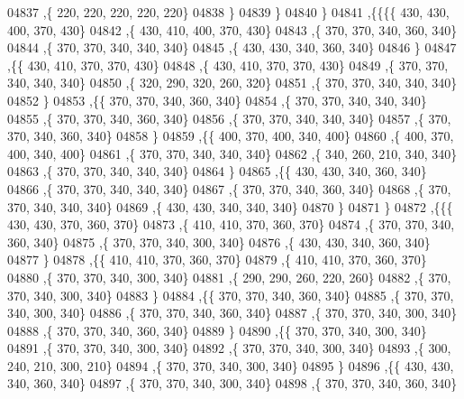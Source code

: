 \begin{DoxyCode}
04837     ,\{   220,   220,   220,   220,   220\}
04838     \}
04839    \}
04840   \}
04841  ,\{\{\{\{   430,   430,   400,   370,   430\}
04842     ,\{   430,   410,   400,   370,   430\}
04843     ,\{   370,   370,   340,   360,   340\}
04844     ,\{   370,   370,   340,   340,   340\}
04845     ,\{   430,   430,   340,   360,   340\}
04846     \}
04847    ,\{\{   430,   410,   370,   370,   430\}
04848     ,\{   430,   410,   370,   370,   430\}
04849     ,\{   370,   370,   340,   340,   340\}
04850     ,\{   320,   290,   320,   260,   320\}
04851     ,\{   370,   370,   340,   340,   340\}
04852     \}
04853    ,\{\{   370,   370,   340,   360,   340\}
04854     ,\{   370,   370,   340,   340,   340\}
04855     ,\{   370,   370,   340,   360,   340\}
04856     ,\{   370,   370,   340,   340,   340\}
04857     ,\{   370,   370,   340,   360,   340\}
04858     \}
04859    ,\{\{   400,   370,   400,   340,   400\}
04860     ,\{   400,   370,   400,   340,   400\}
04861     ,\{   370,   370,   340,   340,   340\}
04862     ,\{   340,   260,   210,   340,   340\}
04863     ,\{   370,   370,   340,   340,   340\}
04864     \}
04865    ,\{\{   430,   430,   340,   360,   340\}
04866     ,\{   370,   370,   340,   340,   340\}
04867     ,\{   370,   370,   340,   360,   340\}
04868     ,\{   370,   370,   340,   340,   340\}
04869     ,\{   430,   430,   340,   340,   340\}
04870     \}
04871    \}
04872   ,\{\{\{   430,   430,   370,   360,   370\}
04873     ,\{   410,   410,   370,   360,   370\}
04874     ,\{   370,   370,   340,   360,   340\}
04875     ,\{   370,   370,   340,   300,   340\}
04876     ,\{   430,   430,   340,   360,   340\}
04877     \}
04878    ,\{\{   410,   410,   370,   360,   370\}
04879     ,\{   410,   410,   370,   360,   370\}
04880     ,\{   370,   370,   340,   300,   340\}
04881     ,\{   290,   290,   260,   220,   260\}
04882     ,\{   370,   370,   340,   300,   340\}
04883     \}
04884    ,\{\{   370,   370,   340,   360,   340\}
04885     ,\{   370,   370,   340,   300,   340\}
04886     ,\{   370,   370,   340,   360,   340\}
04887     ,\{   370,   370,   340,   300,   340\}
04888     ,\{   370,   370,   340,   360,   340\}
04889     \}
04890    ,\{\{   370,   370,   340,   300,   340\}
04891     ,\{   370,   370,   340,   300,   340\}
04892     ,\{   370,   370,   340,   300,   340\}
04893     ,\{   300,   240,   210,   300,   210\}
04894     ,\{   370,   370,   340,   300,   340\}
04895     \}
04896    ,\{\{   430,   430,   340,   360,   340\}
04897     ,\{   370,   370,   340,   300,   340\}
04898     ,\{   370,   370,   340,   360,   340\}

\end{DoxyCode}

